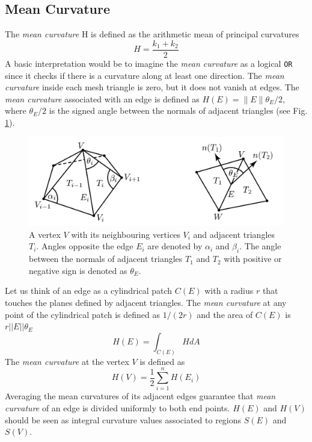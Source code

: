 \subsection{Mean Curvature}
The \textit{mean curvature} H is defined as the arithmetic mean of principal curvatures $$H = \frac{k_1 + k_2}{2}$$  A basic interpretation would be to imagine the \textit{mean curvature} as a logical \texttt{OR} since it checks if there is a curvature along at least one direction.\cite{WEBSITE:gaussiancurvaturedirty}
The \textit{mean curvature} inside each mesh triangle is zero, but it does not vanish at edges. The \textit{mean curvature} associated with an edge is defined as $H(E) = \parallel E \parallel {\theta}_E/2$, where ${\theta}_E/2$ is the signed
angle between the normals of adjacent triangles (see Fig. \ref{fig:mean-curvature}).

\begin{figure}[!h]
  \centering
\includegraphics[width=11.5cm]{images/mean_curvature_paper.png}
\caption{A vertex $V$ with its neighbouring vertices $V_i$ and adjacent triangles $T_i$. Angles opposite the edge $E_i$ are denoted by $\alpha_i$ and $\beta_i$. The
angle between the normals of adjacent triangles $T_1$ and $T_2$ with positive or negative sign is denoted as ${\theta}_E$. \cite{geometryprocessing}}\label{fig:mean-curvature}
\end{figure}
Let us think of an edge as a cylindrical patch $C(E)$ with a radius $r$ that touches the planes defined by adjacent triangles. The \textit{mean curvature} at any point of the cylindrical patch is defined as $1/(2r)$ and the area of $C(E)$ is $r||E||\theta_E$
$$H(E) = \int_{C(E)} HdA$$
The \textit{mean curvature} at the vertex $V$ is defined as $$H(V) = \frac{1}{2} \sum_{i=1}^n H(E_i)$$ Averaging the mean curvatures of its adjacent edges guarantee that \textit{mean curvature} of an edge is divided uniformly to both end points. $H(E)$ and $H(V)$ should be seen as integral curvature values associated to regions $S(E)$ and $S(V)$.
\cite{geometryprocessing}


